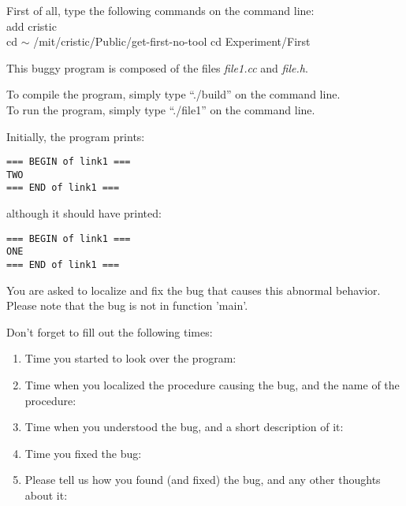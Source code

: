 \documentclass{article}
\title{}
\author{Bug 1 - No Tool}
\date{July 30, 2003}
\begin{document}
\maketitle
\begin{flushleft}
\vspace{0.5in}

\thispagestyle{empty}

First of all, type the following commands on the command line:\\
add cristic\\
cd $\sim$
/mit/cristic/Public/get-first-no-tool
cd Experiment/First


\vspace{0.1in}
This buggy program is composed of the files {\it file1.cc} and 
{\it file.h}. 

\vspace{0.1in}
To compile the program, simply type ``./build'' on the command line.\\
To run the program, simply type ``./file1'' on the command line.


\vspace{0.1in}
Initially, the program prints:

\begin{verbatim}
=== BEGIN of link1 ===
TWO
=== END of link1 ===
\end{verbatim}

although it should have printed:
\begin{verbatim}
=== BEGIN of link1 ===
ONE
=== END of link1 ===
\end{verbatim}

You are asked to localize and fix the bug that causes this abnormal behavior.
Please note that the bug is not in function 'main'.


\vspace{0.3in}
Don't forget to fill out the following times:
\begin{enumerate}
\item{Time you started to look over the program:}
\item{Time when you localized the procedure causing the bug, and the name
      of the procedure:\vspace{0.2in}}
\item{Time when you understood the bug, and a short description of it:\vspace{0.4in}}

\item{Time you fixed the bug:}

\item{Please tell us how you found (and fixed) the bug, and any other thoughts 
about it:}

\end{enumerate}

\end{flushleft}
\end{document}
